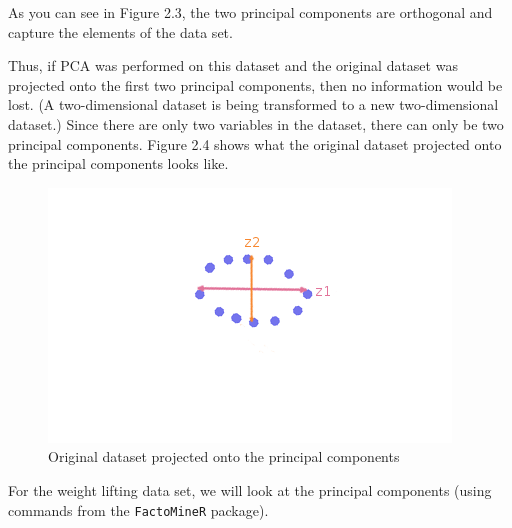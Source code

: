 \documentclass[12pt,twoside]{reedthesis}
\begin{document}
  As you can see in Figure 2.3, the two principal components are
  orthogonal and capture the elements of the data set.
  
  Thus, if PCA was performed on this dataset and the original dataset was
  projected onto the first two principal components, then no information
  would be lost. (A two-dimensional dataset is being transformed to a new
  two-dimensional dataset.) Since there are only two variables in the
  dataset, there can only be two principal components. Figure 2.4 shows
  what the original dataset projected onto the principal components looks
  like.
  
  \begin{figure}[htbp]
  \centering
  \includegraphics{figure/ProjectedPC.png}
  \caption{Original dataset projected onto the principal components}
  \end{figure}
  
  \newpage
  
  For the weight lifting data set, we will look at the principal
  components (using commands from the \texttt{FactoMineR} package).
  
  \begin{Shaded}
  \begin{Highlighting}[]
  \StringTok{ }\NormalTok{(wl2[, -}\NormalTok{(}\NormalTok{,}\NormalTok{,}\NormalTok{)], } \NormalTok{)}
  
  \end{Highlighting}
  \end{Shaded}
  
\end{document}
